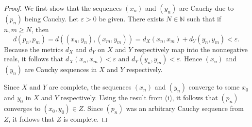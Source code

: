 \documentclass[12pt]{amsart}
\begin{document}
\begin{enumerate}[(i)]
\begin{proof}
        We first show that the sequences $(x_n)$ and $(y_n)$ are Cauchy due to $(p_n)$ being Cauchy. Let $\varepsilon>0$ be given. There exists $N\in \mathbb{N}$ such that if $n,m \geq N$, then \[d(p_n,p_m) = d((x_n,y_n),(x_m,y_m)) = d_X(x_n,x_m) + d_Y(y_n,y_m) < \varepsilon.\] Because the metrics $d_X$ and $d_Y$ on $X$ and $Y$ respectively map into the nonnegative reals, it follows that $d_X(x_n,x_m) < \varepsilon$ and $d_Y(y_n,y_m) < \varepsilon$. Hence $(x_n)$ and $(y_n)$ are Cauchy sequences in $X$ and $Y$ respectively.

        Since $X$ and $Y$ are complete, the sequences $(x_n)$ and $(y_n)$ converge to some $x_0$ and $y_0$ in $X$ and $Y$ respectively. Using the result from (i), it follows that $(p_n)$ converges to $(x_0,y_0)\in Z$. Since $(p_n)$ was an arbitrary Cauchy sequence from $Z$, it follows that $Z$ is complete.
    \end{proof}
\end{enumerate}
\end{document}
